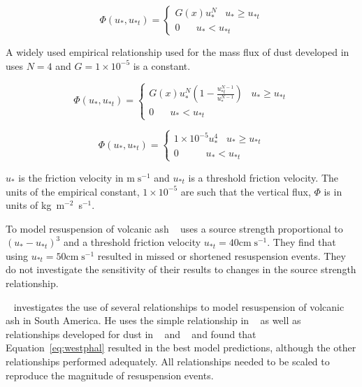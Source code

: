 \begin{equation}
\Phi(u_*, u_{*t}) =\begin{cases}
G(x)u_*^N \;\;\; u_{*} \geq u_{*t} \\
0 \;\;\;\;\;\;  u_* < u_{*t} 
\end{cases}
\label{eq:massflux}
\end{equation}

A widely used empirical relationship used for the mass flux of dust developed in ~\citep{westphal}  
uses $N=4$ and $G=1\times10^{-5}$ is a constant. 

\begin{equation}
\Phi(u_*, u_{*t}) =\begin{cases}
G(x)u_*^N (1-\frac{u_{*t}^{N-1}}{u_{*}^{N-1}})  \;\;\; u_{*} \geq u_{*t} \\
0 \;\;\;\;\;\;  u_* < u_{*t} 
\end{cases}
\label{eq:shao}
\end{equation}


\begin{equation}
\Phi(u_*, u_{*t}) =\begin{cases}
1\times10^{-5}u_*^4 \;\;\; u_{*} \geq u_{*t} \\
0 \;\;\;\;\;\;\;\;\;\;  u_* < u_{*t} 
\end{cases}
\label{eq:westphal}
\end{equation}

$u_*$ is the friction velocity in $\mathrm{m}\;\mathrm{s}^{-1}$ and $u_{*t}$ is a threshold friction velocity.
The units of the empirical constant, $1\times10^{-5}$ are such that the vertical flux, $\Phi$ is in units of kg~m$^{-2}$~s$^{-1}$.


To model resuspension of volcanic ash ~\cite{Leadbetter12} uses a source strength proportional to
$(u_{*}-u_{*t})^{3}$ and a threshold friction velocity $u_{*t} = 40 \mathrm{cm} \; \mathrm{s}^{-1}$. 
They find that using $u_{*t} = 50 \mathrm{cm} \; \mathrm{s}^{-1}$ resulted in missed or shortened resuspension events. 
They do not investigate the sensitivity of their results to changes in
the source strength relationship.

~\cite{Folch14} investigates the use of several relationships to model resuspension of volcanic ash in South America.
He uses the simple relationship in ~\cite{westphal} as well as relationships developed for dust in ~\cite{Marticorena97} and
~\cite{Shao93} and found that Equation~\ref{eq:westphal} resulted in the best model predictions, although the other
relationships performed adequately. All relationships needed to be scaled to reproduce the magnitude of resuspension events.

